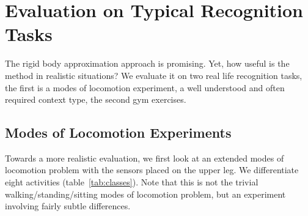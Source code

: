 
\section{Evaluation on Typical Recognition Tasks}
The rigid body 
approximation approach is promising. Yet, how useful is the method
in realistic situations? We evaluate it on two real life recognition
tasks, the first is a modes of locomotion experiment, a well understood
and often required context type, the second gym exercises.


\subsection{Modes of Locomotion Experiments}
Towards a more realistic evaluation, we first look at an extended
modes of locomotion problem with the sensors placed on the upper leg. 
We differentiate eight activities (table~\ref{tab:classes}). 
Note that this is not the trivial walking/standing/sitting
modes of locomotion problem, but an experiment involving fairly subtle
differences.


